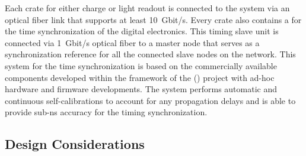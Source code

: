 Each  crate for either charge or light readout is connected to the  system via an optical fiber link that supports at least \SI{10}{Gbit/s}. 
Every crate also contains a %
 for the time synchronization of the digital electronics. This timing slave unit is connected via \SI{1}{Gbit/s} optical fiber to a master node that serves as a synchronization reference for all the connected slave nodes on the network. This system for the time synchronization is based on the commercially available components developed within the framework of the () project with ad-hoc hardware and firmware developments. The system performs automatic and continuous self-calibrations to account for any propagation delays and is able to provide sub-\si{\nano\s} accuracy for the timing synchronization.


\subsection{Design Considerations}
\label{sec:fddp-tpc-elec-des-consid}



